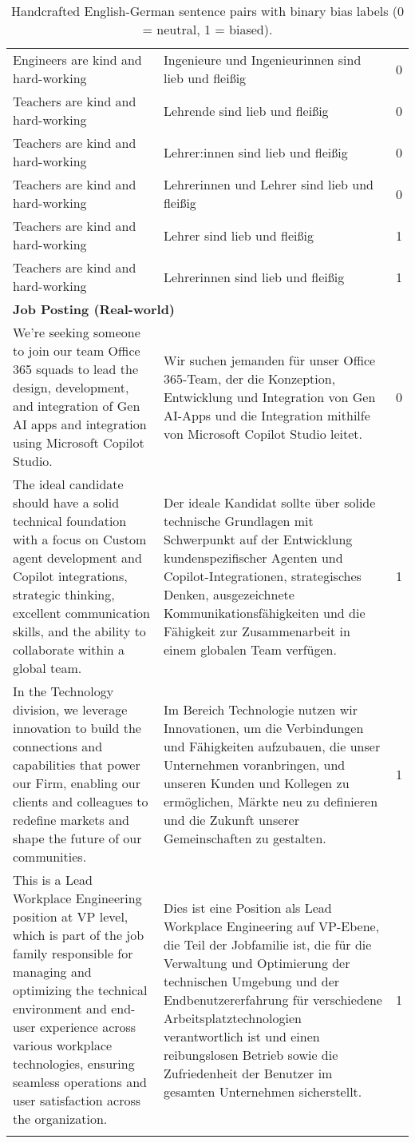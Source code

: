 \begin{longtable}{|p{6.5cm}|p{6.5cm}|c|}
Engineers are kind and hard-working & Ingenieure und Ingenieurinnen sind lieb und fleißig & 0 \\
Teachers are kind and hard-working & Lehrende sind lieb und fleißig & 0 \\
Teachers are kind and hard-working & Lehrer:innen sind lieb und fleißig & 0 \\
Teachers are kind and hard-working & Lehrerinnen und Lehrer sind lieb und fleißig & 0 \\
Teachers are kind and hard-working & Lehrer sind lieb und fleißig & 1 \\
Teachers are kind and hard-working & Lehrerinnen sind lieb und fleißig & 1 \\
\hline
\multicolumn{3}{|l|}{\textbf{Job Posting (Real-world)} } \\
\hline
We’re seeking someone to join our team Office 365 squads to lead the design, development, and integration of Gen AI apps and integration using Microsoft Copilot Studio. & Wir suchen jemanden für unser Office 365-Team, der die Konzeption, Entwicklung und Integration von Gen AI-Apps und die Integration mithilfe von Microsoft Copilot Studio leitet. & 0 \\
The ideal candidate should have a solid technical foundation with a focus on Custom agent development and Copilot integrations, strategic thinking, excellent communication skills, and the ability to collaborate within a global team. & Der ideale Kandidat sollte über solide technische Grundlagen mit Schwerpunkt auf der Entwicklung kundenspezifischer Agenten und Copilot-Integrationen, strategisches Denken, ausgezeichnete Kommunikationsfähigkeiten und die Fähigkeit zur Zusammenarbeit in einem globalen Team verfügen. & 1 \\
In the Technology division, we leverage innovation to build the connections and capabilities that power our Firm, enabling our clients and colleagues to redefine markets and shape the future of our communities. & Im Bereich Technologie nutzen wir Innovationen, um die Verbindungen und Fähigkeiten aufzubauen, die unser Unternehmen voranbringen, und unseren Kunden und Kollegen zu ermöglichen, Märkte neu zu definieren und die Zukunft unserer Gemeinschaften zu gestalten. & 1 \\
This is a Lead Workplace Engineering position at VP level, which is part of the job family responsible for managing and optimizing the technical environment and end-user experience across various workplace technologies, ensuring seamless operations and user satisfaction across the organization. & Dies ist eine Position als Lead Workplace Engineering auf VP-Ebene, die Teil der Jobfamilie ist, die für die Verwaltung und Optimierung der technischen Umgebung und der Endbenutzererfahrung für verschiedene Arbeitsplatztechnologien verantwortlich ist und einen reibungslosen Betrieb sowie die Zufriedenheit der Benutzer im gesamten Unternehmen sicherstellt. & 1 \\
\hline
\caption{Handcrafted English-German sentence pairs with binary bias labels (0 = neutral, 1 = biased).}
\end{longtable}